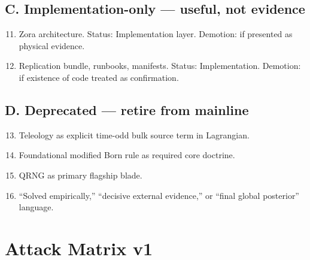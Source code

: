 \documentclass[reprint,amsmath,amssymb,aps,showkeys]{revtex4-2}
\begin{document}
\subsection*{C. Implementation-only --- useful, not evidence}
\begin{enumerate}
\setcounter{enumi}{10}
\item Zora architecture. Status: Implementation layer. Demotion: if presented as physical evidence.
\item Replication bundle, runbooks, manifests. Status: Implementation. Demotion: if existence of code treated as confirmation.
\end{enumerate}

\subsection*{D. Deprecated --- retire from mainline}
\begin{enumerate}
\setcounter{enumi}{12}
\item Teleology as explicit time-odd bulk source term in Lagrangian.
\item Foundational modified Born rule as required core doctrine.
\item QRNG as primary flagship blade.
\item ``Solved empirically,'' ``decisive external evidence,'' or ``final global posterior'' language.
\end{enumerate}

\section{Attack Matrix v1}
\label{app:attack_matrix}
\end{document}
